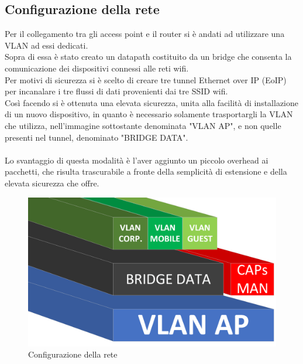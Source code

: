\documentclass[Realizzazione.tex]{subfiles}
\begin{document}
\newpage
\subsection{Configurazione della rete}
Per il collegamento tra gli access point e il router si è andati ad utilizzare una VLAN ad essi dedicati. \\
Sopra di essa è stato creato un datapath costituito da un bridge che consenta la comunicazione dei dispositivi connessi alle reti wifi. \\
Per motivi di sicurezza si è scelto di creare tre tunnel Ethernet over IP (EoIP) per incanalare i tre flussi di dati provenienti dai tre SSID wifi. \\
Così facendo si è ottenuta una elevata sicurezza, unita alla facilità di installazione di un nuovo dispositivo, in quanto è necessario solamente trasportargli la VLAN che utilizza, nell'immagine sottostante denominata "VLAN AP", e non quelle presenti nel tunnel, denominato "BRIDGE DATA". \\\\
Lo svantaggio di questa modalità è l'aver aggiunto un piccolo overhead ai pacchetti, che risulta trascurabile a fronte della semplicità di estensione e della elevata sicurezza che offre.

\begin{figure}[H]
	\centering
	\includegraphics[width=0.6\linewidth]{"images/VLAN"}
	\caption{Configurazione della rete}
	\label{fig:Configurazione della rete}
\end{figure}
\end{document}

